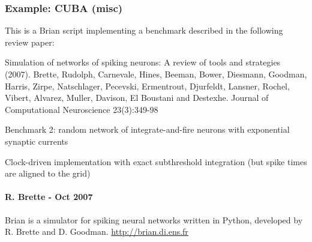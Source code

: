 \documentclass[letterpaper,10pt,english]{manual}
\begin{document}
\hypertarget{index-37}{}\subsubsection{Example: CUBA (misc)}

This is a Brian script implementing a benchmark described
in the following review paper:

Simulation of networks of spiking neurons: A review of tools and strategies (2007).
Brette, Rudolph, Carnevale, Hines, Beeman, Bower, Diesmann, Goodman, Harris, Zirpe,
Natschlager, Pecevski, Ermentrout, Djurfeldt, Lansner, Rochel, Vibert, Alvarez, Muller,
Davison, El Boustani and Destexhe.
Journal of Computational Neuroscience 23(3):349-98

Benchmark 2: random network of integrate-and-fire neurons with exponential synaptic currents

Clock-driven implementation with exact subthreshold integration
(but spike times are aligned to the grid)


\paragraph{R. Brette - Oct 2007}

Brian is a simulator for spiking neural networks written in Python, developed by
R. Brette and D. Goodman.
\href{http://brian.di.ens.fr}{http://brian.di.ens.fr}
\end{document}
